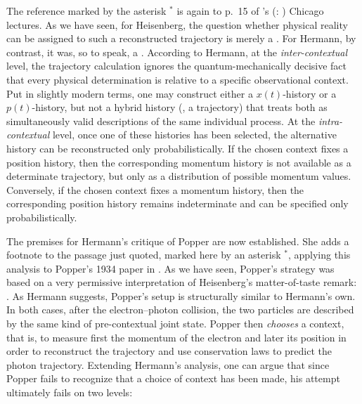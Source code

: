 \documentclass[pdflatex]{sn-jnl}
\renewcommand{\citets}[2][]{\citeauthor{#2}'s (\citeyear{#2}\if\relax\detokenize{#1}\relax\else: #1\fi)}
\newcommand{\NW}{\jt{Die Naturwissenschaften}\xspace}
\newcommand{\NGQ}[2]{\citep[#1/#2]{Hermann1935}}
\begin{document}
%
The reference marked by the asterisk $^{\ast}$ is again to p.~15 of \citets{Heisenberg1930} Chicago lectures. As we have seen, for Heisenberg, the question whether physical reality can be assigned to such a reconstructed trajectory is merely a . For Hermann, by contrast, it was, so to speak, a . According to Hermann, at the \emph{inter-contextual} level, the trajectory calculation ignores the quantum-mechanically decisive fact that every physical determination is relative to a specific observational context. Put in slightly modern terms, one may construct either a $x(t)$-history or a $p(t)$-history, but not a hybrid history (\ie, a trajectory) that treats both as simultaneously valid descriptions of the same individual process. At the \emph{intra-contextual} level, once one of these histories has been selected, the alternative history can be reconstructed only probabilistically. If the chosen context fixes a position history, then the corresponding momentum history is not available as a determinate trajectory, but only as a distribution of possible momentum values. Conversely, if the chosen context fixes a momentum history, then the corresponding position history remains indeterminate and can be specified only probabilistically.

The premises for Hermann's critique of Popper are now established. She adds a footnote to the passage just quoted, marked here by an asterisk $^{\ast}$, applying this analysis to Popper's 1934 paper in \NW. As we have seen, Popper's strategy was based on a very permissive interpretation of Heisenberg's matter-of-taste remark:  \NGQ{123}{263\fn{10}}. As Hermann suggests, Popper's setup is structurally similar to Hermann's own. In both cases, after the electron--photon collision, the two particles are described by the same kind of pre-contextual joint state. Popper then \emph{chooses} a context, that is, to measure first the momentum of the electron and later its position in order to reconstruct the trajectory and use conservation laws to predict the photon trajectory. Extending Hermann's analysis, one can argue that since Popper fails to recognize that a choice of context has been made, his attempt ultimately fails on two levels:
\end{document}
